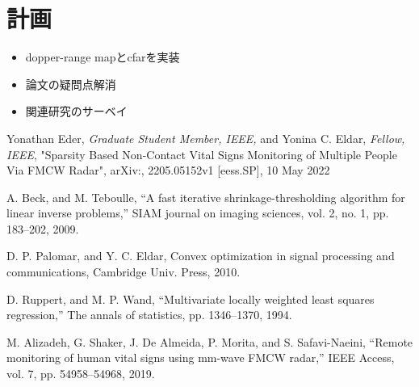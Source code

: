 \documentclass[dvipdfmx]{jsarticle}
\begin{document}
\section{計画}
\begin{itemize}
    \item dopper-range mapとcfarを実装
    \item 論文の疑問点解消
    \item 関連研究のサーベイ
\end{itemize}
\begin{thebibliography}{}
\item Yonathan Eder, \textit{Graduate Student Member, IEEE, }and Yonina C. Eldar, \textit{Fellow, IEEE}, "Sparsity Based Non-Contact Vital Signs Monitoring of Multiple People Via FMCW Radar", arXiv:, 2205.05152v1 [eess.SP], 10 May 2022
\item A. Beck, and M. Teboulle, “A fast iterative shrinkage-thresholding algorithm
for linear inverse problems,” SIAM journal on imaging sciences,
vol. 2, no. 1, pp. 183–202, 2009.
\item D. P. Palomar, and Y. C. Eldar, Convex optimization in signal processing and communications, Cambridge Univ. Press, 2010.
\item D. Ruppert, and M. P. Wand, “Multivariate locally weighted least squares
regression,” The annals of statistics, pp. 1346–1370, 1994.
\item M. Alizadeh, G. Shaker, J. De Almeida, P. Morita, and S. Safavi-Naeini, “Remote monitoring of human vital signs using mm-wave FMCW radar,” IEEE Access, vol. 7, pp. 54958–54968, 2019.
\end{thebibliography}
\end{document}
